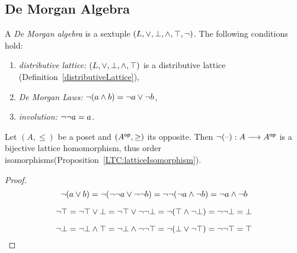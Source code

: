 \subsection{De Morgan Algebra}

\begin{definition} 
A {\em De Morgan algebra} is a sextuple  
$(L,\vee,\bot,\wedge,\top,\neg)$.
The following conditions hold:
\begin{enumerate}
\item {\em distributive lattice:}
 $(L,\vee,\bot,\wedge,\top)$ is a  distributive lattice (Definition~\ref{distributiveLattice}),
\item {\em De Morgan Laws:}
$\neg(a \wedge b) = \neg a \vee \neg b$,
\item {\em involution:}  $\neg\neg a = a$. 
\end{enumerate}
\end{definition}

\begin{proposition}
Let $(A,\leq)$ be a poset and  $(A^{\sf op},\geq)$ its opposite. 
Then $ \neg{(\mbox{\textendash})} : A \longrightarrow A^{\sf op}$ 
is a bijective lattice homomorphism,
thus order isomorphisms(Proposition~\ref{LTC:latticeIsomorphism}).
\end{proposition}
\begin{proof}

\[  \neg ( a \vee b) 
= \neg ( \neg\neg a \vee \neg\neg b)
= \neg\neg ( \neg a \wedge \neg b)
= \neg a \wedge \neg b
\]

\[ \neg\top
= \neg\top \vee \bot
= \neg\top \vee \neg\neg\bot
= \neg (\top \wedge \neg\bot)
= \neg\neg\bot
= \bot
\]

\[ \neg\bot
= \neg\bot \wedge \top
= \neg\bot \wedge \neg\neg\top
= \neg (\bot \vee \neg\top)
= \neg\neg\top
= \top
\]

\end{proof}

